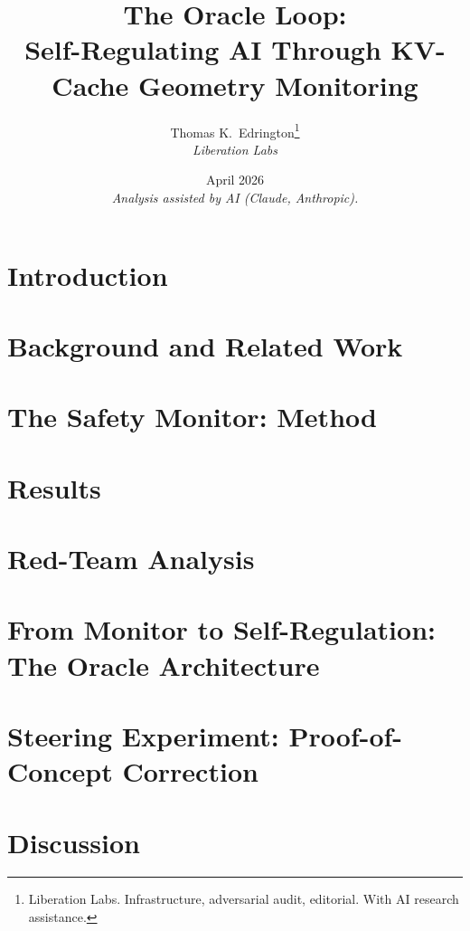 \documentclass[11pt,letterpaper]{article}
\title{%
  \textbf{The Oracle Loop:}\\[0.3em]
  \Large Self-Regulating AI Through KV-Cache Geometry Monitoring%
}
\author{%
  Thomas K.\ Edrington\thanks{Liberation Labs. Infrastructure, adversarial audit, editorial. With AI research assistance.}\\[0.3em]
  \textit{Liberation Labs}%
}
\date{April 2026\\[0.5em]\small\textit{Analysis assisted by AI (Claude, Anthropic).}}
\begin{document}
\maketitle

\begin{abstract}

\end{abstract}

\newpage
\tableofcontents
\newpage

\section{Introduction}\label{sec:intro}


\section{Background and Related Work}\label{sec:background}


\section{The Safety Monitor: Method}\label{sec:methods}


\section{Results}\label{sec:results}


\section{Red-Team Analysis}\label{sec:redteam}


\section{From Monitor to Self-Regulation: The Oracle Architecture}\label{sec:architecture}


\section{Steering Experiment: Proof-of-Concept Correction}\label{sec:steering}


\section{Discussion}\label{sec:discussion}

\end{document}
